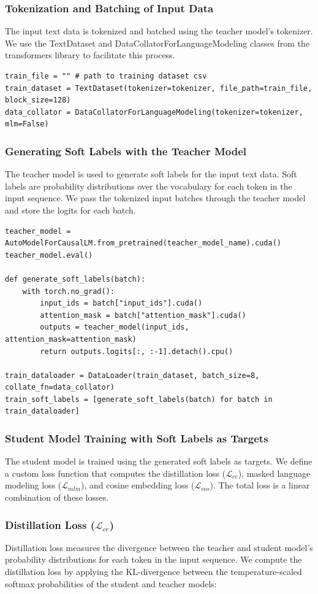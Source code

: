 \documentclass{article} %
\begin{document}
\subsubsection{Tokenization and Batching of Input Data}
The input text data is tokenized and batched using the teacher model's tokenizer. We use the TextDataset and DataCollatorForLanguageModeling classes from the transformers library to facilitate this process.
\begin{lstlisting}
train_file = "" # path to training dataset csv
train_dataset = TextDataset(tokenizer=tokenizer, file_path=train_file, block_size=128)
data_collator = DataCollatorForLanguageModeling(tokenizer=tokenizer, mlm=False)
\end{lstlisting}
\subsubsection{Generating Soft Labels with the Teacher Model}
The teacher model is used to generate soft labels for the input text data. Soft labels are probability distributions over the vocabulary for each token in the input sequence. We pass the tokenized input batches through the teacher model and store the logits for each batch.
\begin{lstlisting}
teacher_model = AutoModelForCausalLM.from_pretrained(teacher_model_name).cuda()
teacher_model.eval()

def generate_soft_labels(batch):
    with torch.no_grad():
        input_ids = batch["input_ids"].cuda()
        attention_mask = batch["attention_mask"].cuda()
        outputs = teacher_model(input_ids, attention_mask=attention_mask)
        return outputs.logits[:, :-1].detach().cpu()

train_dataloader = DataLoader(train_dataset, batch_size=8, collate_fn=data_collator)
train_soft_labels = [generate_soft_labels(batch) for batch in train_dataloader]

\end{lstlisting}
\subsubsection{Student Model Training with Soft Labels as Targets}
The student model is trained using the generated soft labels as targets. We define a custom loss function that computes the distillation loss ($\mathcal{L}_{ce}$), masked language modeling loss ($\mathcal{L}_{mlm}$), and cosine embedding loss ($\mathcal{L}_{cos}$). The total loss is a linear combination of these losses.
\subsubsection{Distillation Loss ($\mathcal{L}_{ce}$)}
Distillation loss measures the divergence between the teacher and student model's probability distributions for each token in the input sequence. We compute the distillation loss by applying the KL-divergence between the temperature-scaled softmax probabilities of the student and teacher models:
\end{document}

